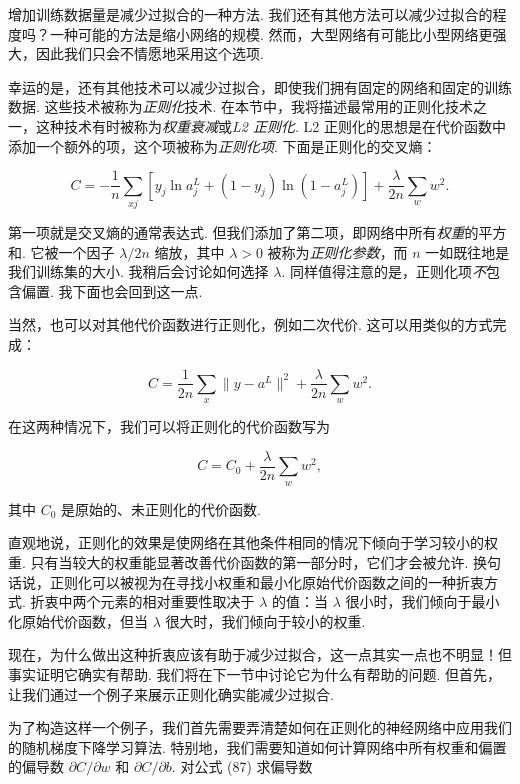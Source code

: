 增加训练数据量是减少过拟合的一种方法. 我们还有其他方法可以减少过拟合的程度吗？一种可能的方法是缩小网络的规模. 然而，大型网络有可能比小型网络更强大，因此我们只会不情愿地采用这个选项.

幸运的是，还有其他技术可以减少过拟合，即使我们拥有固定的网络和固定的训练数据. 这些技术被称为\emph{正则化}技术. 在本节中，我将描述最常用的正则化技术之一，这种技术有时被称为\emph{权重衰减}或\emph{L2 正则化}. L2 正则化的思想是在代价函数中添加一个额外的项，这个项被称为\emph{正则化项}. 下面是正则化的交叉熵：

\begin{equation}
C = -\frac{1}{n} \sum_{xj} \left[ y_j \ln a^L_j+(1-y_j) \ln (1-a^L_j)\right] + \frac{\lambda}{2n} \sum_w w^2.
\tag{85}
\end{equation}

\noindent 第一项就是交叉熵的通常表达式. 但我们添加了第二项，即网络中所有\emph{权重}的平方和. 它被一个因子 $\lambda / 2n$ 缩放，其中 $\lambda > 0$ 被称为\emph{正则化参数}，而 $n$ 一如既往地是我们训练集的大小. 我稍后会讨论如何选择 $\lambda$. 同样值得注意的是，正则化项\emph{不}包含偏置. 我下面也会回到这一点.

当然，也可以对其他代价函数进行正则化，例如二次代价. 这可以用类似的方式完成：

\begin{equation}
C = \frac{1}{2n} \sum_x \|y-a^L\|^2 + \frac{\lambda}{2n} \sum_w w^2.
\tag{86}
\end{equation}

\noindent 在这两种情况下，我们可以将正则化的代价函数写为

\begin{equation}
C = C_0 + \frac{\lambda}{2n} \sum_w w^2,
\tag{87}
\end{equation}

\noindent 其中 $C_0$ 是原始的、未正则化的代价函数.

直观地说，正则化的效果是使网络在其他条件相同的情况下倾向于学习较小的权重. 只有当较大的权重能显著改善代价函数的第一部分时，它们才会被允许. 换句话说，正则化可以被视为在寻找小权重和最小化原始代价函数之间的一种折衷方式. 折衷中两个元素的相对重要性取决于 $\lambda$ 的值：当 $\lambda$ 很小时，我们倾向于最小化原始代价函数，但当 $\lambda$ 很大时，我们倾向于较小的权重.

现在，为什么做出这种折衷应该有助于减少过拟合，这一点其实一点也不明显！但事实证明它确实有帮助. 我们将在下一节中讨论它为什么有帮助的问题. 但首先，让我们通过一个例子来展示正则化确实能减少过拟合.

为了构造这样一个例子，我们首先需要弄清楚如何在正则化的神经网络中应用我们的随机梯度下降学习算法. 特别地，我们需要知道如何计算网络中所有权重和偏置的偏导数 $\partial C / \partial w$ 和 $\partial C / \partial b$. 对公式 (87) 求偏导数

